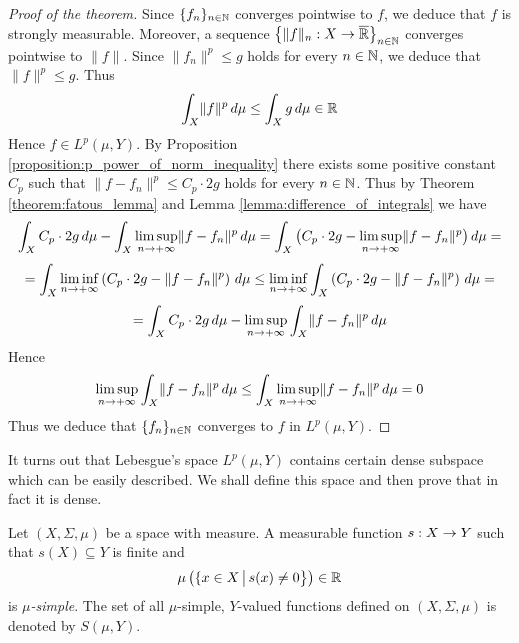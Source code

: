 \begin{proof}[Proof of the theorem]
    Since $\{f_n\}_{n\in {\mathbb N}}$ converges pointwise to $f$, we deduce that $f$ is strongly measurable. Moreover, a sequence $\big\{\lVert f\rVert_n:X\rightarrow \overline{{\mathbb R}}\big\}_{n\in {\mathbb N}}$ converges pointwise to $\lVert f\rVert$. Since $\lVert f_n\rVert^p\leq g$ holds for every $n\in {\mathbb N}$, we deduce that $\lVert f\rVert^p \leq g$. Thus
    $$\int_X\lVert f\rVert^p \,d\mu \leq \int_Xg\,d\mu \in {\mathbb R}$$
    Hence $f\in L^p(\mu, Y)$. By Proposition \ref{proposition:p_power_of_norm_inequality} there exists some positive constant $C_p$ such that $\lVert f - f_n\rVert^p \leq C_p\cdot 2g$ holds for every $n\in {\mathbb N}$. Thus by Theorem \ref{theorem:fatous_lemma} and Lemma \ref{lemma:difference_of_integrals} we have
    $$\int_XC_p\cdot 2g\,d\mu - \int_X\limsup_{n\rightarrow +\infty}\lVert f-f_n\rVert^p\,d\mu  = \int_X \big(C_p\cdot 2g - \limsup_{n\rightarrow +\infty}\lVert f-f_n\rVert^p\big)\,d\mu = $$
    $$= \int_X\liminf_{n\rightarrow +\infty}\left(C_p\cdot 2g - \lVert f-f_n\rVert^p\right)\,d\mu \leq \liminf_{n\rightarrow +\infty}\int_X\left(C_p\cdot 2g - \lVert f- f_n\rVert^p\right)\,d\mu =$$
    $$= \int_X C_p\cdot 2g\,d\mu - \limsup_{n\rightarrow +\infty}\int_X \lVert f-f_n\rVert^p\,d\mu $$
    Hence
    $$\limsup_{n\rightarrow +\infty}\int_X\lVert f - f_n\rVert^p\,d\mu \leq \int_X\limsup_{n\rightarrow +\infty}\lVert f - f_n\rVert^p\,d\mu = 0$$
    Thus we deduce that $\{f_n\}_{n\in {\mathbb N}}$ converges to $f$ in $L^p(\mu,Y)$.
\end{proof}
\noindent
It turns out that Lebesgue's space $L^p(\mu, Y)$ contains certain dense subspace which can be easily described. We shall define this space and then prove that in fact it is dense.

\begin{definition}
    Let $(X,\Sigma, \mu)$ be a space with measure. A measurable function $s:X\rightarrow Y$ such that $s(X)\subseteq Y$ is finite and
    $$\mu\left(\{x\in X\,\big|\,s(x)\neq 0\big\}\right) \in {\mathbb R}$$
    is \textit{$\mu$-simple}. The set of all $\mu$-simple, $Y$-valued functions defined on $(X,\Sigma, \mu)$ is denoted by $S(\mu, Y)$.
\end{definition}

